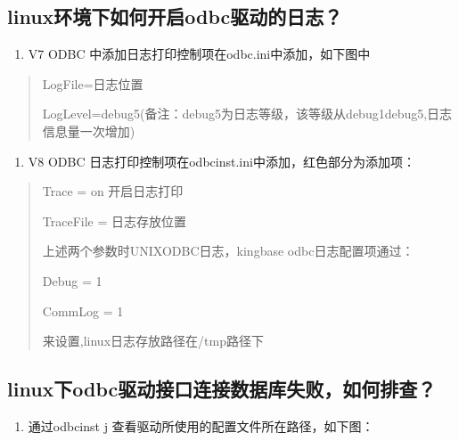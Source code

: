 \documentclass[letterpaper,10pt,english]{sphinxmanual}
\begin{document}
\subsection{linux环境下如何开启odbc驱动的日志？}
\label{\detokenize{interface/odbc:linuxodbc}}\begin{enumerate}
%
\item {} 
V7 ODBC 中添加日志打印控制项在odbc.ini中添加，如下图中

\end{enumerate}
\begin{quote}

\begin{figure}[htbp]
\centering

\noindent{}
\end{figure}

LogFile=日志位置

LogLevel=debug5(备注：debug5为日志等级，该等级从debug1\sphinxhyphen{}\sphinxhyphen{}\sphinxhyphen{}debug5,日志信息量一次增加)
\end{quote}
\begin{enumerate}
%
\setcounter{enumi}{1}
\item {} 
V8 ODBC 日志打印控制项在odbcinst.ini中添加，红色部分为添加项：

\end{enumerate}
\begin{quote}

\begin{figure}[htbp]
\centering

\noindent{}
\end{figure}

Trace = on 开启日志打印

TraceFile = 日志存放位置

上述两个参数时UNIXODBC日志，kingbase odbc日志配置项通过：

Debug = 1

CommLog = 1

来设置,linux日志存放路径在/tmp路径下
\end{quote}


\subsection{linux下odbc驱动接口连接数据库失败，如何排查？}
\label{\detokenize{interface/odbc:id2}}\begin{enumerate}
%
\item {} 
通过odbcinst \sphinxhyphen{}j 查看驱动所使用的配置文件所在路径，如下图：

\end{enumerate}
\end{document}
